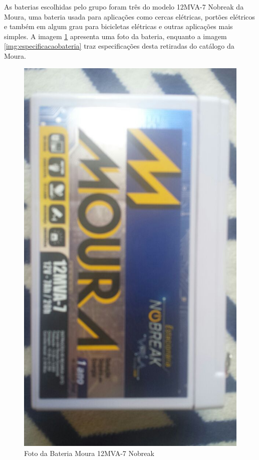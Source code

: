 As baterias escolhidas pelo grupo foram três do modelo 12MVA-7 Nobreak da Moura, uma bateria usada para aplicações como cercas elétricas, portões elétricos e também em algum grau para bicicletas elétricas e outras aplicações mais simples. A imagem \ref{img:bateriabike} apresenta uma foto da bateria, enquanto a imagem \ref{img:especificacaobateria} traz especificações desta retiradas do catálogo da Moura.

\newpage

	\begin{figure}[!htb]
		\centering
		\includegraphics[scale=0.3, angle=90]{bateria_bike.jpeg}
		\caption{Foto da Bateria Moura 12MVA-7 Nobreak}
		\label{img:bateriabike}
	\end{figure}
	
